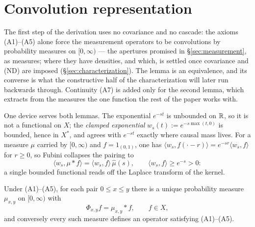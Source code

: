 
\section{Convolution representation}\label{sec:representation}

The first step of the derivation uses no covariance and no cascade: the axioms
(A1)--(A5) alone force the measurement operators to be convolutions by probability
measures on $[0,\infty)$ --- the apertures promised in \S\ref{sec:measurement}, as
measures; where they have densities, and which, is settled once covariance and (ND) are
imposed (\S\ref{sec:characterization}). The lemma is an equivalence, and its converse is
what the constructive half of the characterization will later run backwards through.
Continuity (A7) is added only for the second lemma, which extracts from the measures the
one function the rest of the paper works with.

One device serves both lemmas. The exponential $e^{-st}$ is unbounded on $\mathbb{R}$, so it is
not a functional on $X$; the \emph{clamped exponential} $w_s(t) := e^{-s\max(t,0)}$ is
bounded, hence in $X^*$, and agrees with $e^{-st}$ exactly where causal mass lives. For a
measure $\mu$ carried by $[0,\infty)$ and $f = 1_{(0,1)}$, one has
$\langle w_s, f(\cdot - r)\rangle = e^{-sr}\langle w_s, f\rangle$ for $r \ge 0$, so Fubini
collapses the pairing to
\begin{equation}\label{eq:clamped}
  \langle w_s, \mu * f\rangle = \langle w_s, f\rangle\,\hat\mu(s),
  \qquad \langle w_s, f\rangle \ge e^{-s} > 0 :
\end{equation}
a single bounded functional reads off the Laplace transform of the kernel.

\begin{lemma}[representation]\label{lem:convolution-representation}
Under (A1)--(A5), for each pair $0 \le x \le y$ there is a unique probability measure
$\mu_{x,y}$ on $[0,\infty)$ with
\[
  \Phi_{x,y} f = \mu_{x,y} * f, \qquad f \in X,
\]
and conversely every such measure defines an operator satisfying (A1)--(A5).
\end{lemma}

